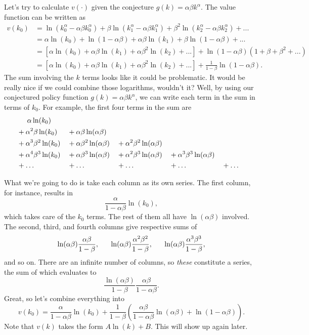 \documentclass[12pt]{article}
\theoremstyle{definition}
\begin{document}
Let's try to calculate $v(\cdot)$ given the conjecture $g(k)= \alpha \beta k^{\alpha}$. The value function can be written as
\begin{align*}
	 v(k_0) &= \ln( k_0^{\alpha} - \alpha \beta k_0^{\alpha}) + \beta \ln( k_1^{\alpha} - \alpha \beta k_1^{\alpha}) + \beta^2 \ln( k_2^{\alpha} - \alpha \beta k_2^{\alpha}) + ...\\
	 	&= \alpha \ln(k_0) + \ln(1 - \alpha \beta) + \alpha \beta \ln(k_1) + \beta\ln(1 - \alpha \beta) + ... \\
		& = [\alpha \ln(k_0) + \alpha \beta \ln(k_1) + \alpha \beta^2 \ln(k_2) + ...] + \ln(1 - \alpha \beta)(1 + \beta + \beta^2 + ... )\\
		& = [\alpha \ln(k_0) + \alpha \beta \ln(k_1) + \alpha \beta^2 \ln(k_2) + ...] + \frac{1}{1 - \beta}\ln(1 - \alpha \beta).
\end{align*}
The sum involving the $k$ terms looks like it could be problematic. It would be really nice if we could combine those logarithms, wouldn't it? Well, by using our conjectured policy function $g(k)=\alpha \beta k^{\alpha}$, we can write each term in the sum in terms of $k_0$. For example, the first four terms in the sum are
\begin{align*}
&\hspace{.5cm}	\alpha \ln(k_0)  \\
&+ \alpha^2 \beta \ln(k_0) &&+ \alpha \beta \ln(\alpha \beta)  \\
&+ \alpha^3 \beta^2 \ln( k_0) &&+  \alpha \beta^2 \ln(\alpha \beta) &&+ \alpha^2 \beta^2 \ln(\alpha \beta)  \\
&+ \alpha^4 \beta^3 \ln( k_0) &&+ \alpha \beta^3 \ln(\alpha \beta) &&+ \alpha^2 \beta^3 \ln(\alpha \beta ) &&+ \alpha^3 \beta^3 \ln(\alpha \beta)  \\
&+ \hdots && + \hdots  && + \hdots && + \hdots && + \hdots
\end{align*}

What we're going to do is take each column as its own series. The first column, for instance, results in
	\[\frac{\alpha}{1 - \alpha \beta} \ln(k_0), 	\]
which takes care of the $k_0$ terms. The rest of them all have $\ln(\alpha \beta)$ involved. The second, third, and fourth columns give respective sums of
	\[	 \ln(\alpha \beta)\frac{\alpha \beta}{1 - \beta}, \indent	 \ln(\alpha \beta)\frac{\alpha^2 \beta^2}{1 - \beta}, \indent \ln(\alpha \beta)\frac{\alpha^3 \beta^3}{1 - \beta}, \]
and so on. There are an infinite number of columns, so \emph{these} constitute a series, the sum of which evaluates to
	\[\frac{ \ln(\alpha \beta)}{1 - \beta} \frac{\alpha \beta}{1 - \alpha \beta}.	\]
Great, so let's combine everything into
\begin{equation}
	v(k_0) = \frac{\alpha}{1 - \alpha \beta} \ln(k_0) + \frac{1}{1 - \beta}\left( \frac{\alpha \beta}{1 - \alpha \beta}\ln(\alpha \beta) + \ln(1 - \alpha \beta)	 \right). \label{cobbvaluek_0}
\end{equation}
Note that $v(k)$ takes the form $A \ln(k) + B$. This will show up again later.
\end{document}
